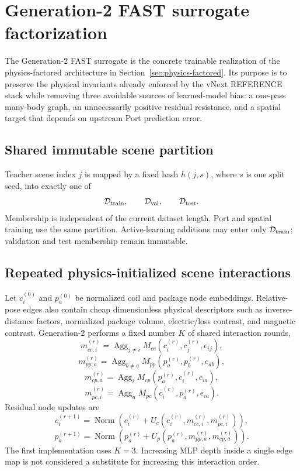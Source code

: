 \section{Generation-2 FAST surrogate factorization}
\label{sec:generation2-fast}

The Generation-2 FAST surrogate is the concrete trainable realization of the
physics-factored architecture in Section~\ref{sec:physics-factored}.  Its
purpose is to preserve the physical invariants already enforced by the vNext
REFERENCE stack while removing three avoidable sources of learned-model bias:
a one-pass many-body graph, an unnecessarily positive residual resistance, and
a spatial target that depends on upstream Port prediction error.

\subsection{Shared immutable scene partition}

Teacher scene index $j$ is mapped by a fixed hash $h(j,s)$, where $s$ is one
split seed, into exactly one of
\[
  \mathcal D_{\rm train},\qquad
  \mathcal D_{\rm val},\qquad
  \mathcal D_{\rm test}.
\]
Membership is independent of the current dataset length.  Port and spatial
training use the same partition.  Active-learning additions may enter only
$\mathcal D_{\rm train}$; validation and test membership remain immutable.

\subsection{Repeated physics-initialized scene interactions}

Let $c_i^{(0)}$ and $p_a^{(0)}$ be normalized coil and package node embeddings.
Relative-pose edges also contain cheap dimensionless physical descriptors such
as inverse-distance factors, normalized package volume, electric/loss contrast,
and magnetic contrast.  Generation-2 performs a fixed number $K$ of shared
interaction rounds,
\[
 m_{cc,i}^{(r)}
 =\mathop{\mathrm{Agg}}_{j\ne i}
 M_{cc}(c_i^{(r)},c_j^{(r)},e_{ij}),
\]
\[
 m_{pp,a}^{(r)}
 =\mathop{\mathrm{Agg}}_{b\ne a}
 M_{pp}(p_a^{(r)},p_b^{(r)},e_{ab}),
\]
\[
 m_{cp,a}^{(r)}
 =\mathop{\mathrm{Agg}}_i
 M_{cp}(p_a^{(r)},c_i^{(r)},e_{ia}),
\]
\[
 m_{pc,i}^{(r)}
 =\mathop{\mathrm{Agg}}_a
 M_{pc}(c_i^{(r)},p_a^{(r)},e_{ia}).
\]
Residual node updates are
\[
 c_i^{(r+1)}
 =\operatorname{Norm}\!\left(
 c_i^{(r)}+U_c(c_i^{(r)},m_{cc,i}^{(r)},m_{pc,i}^{(r)})
 \right),
\]
\[
 p_a^{(r+1)}
 =\operatorname{Norm}\!\left(
 p_a^{(r)}+U_p(p_a^{(r)},m_{pp,a}^{(r)},m_{cp,a}^{(r)})
 \right).
\]
The first implementation uses $K=3$.  Increasing MLP depth inside a single edge
map is not considered a substitute for increasing this interaction order.

